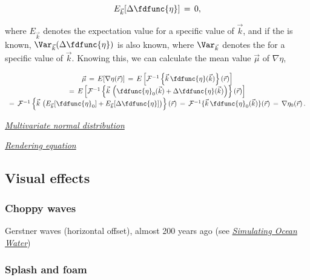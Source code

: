 \begin{equation}
E_{\vec{k}}[\Delta\fdfunc{\eta}] \,=\, 0,
\end{equation}

where $E_{\vec{k}}$ denotes the expectation value for a specific value of $\vec{k}$, and if the  is known, $\Var_{\vec{k}}(\Delta\fdfunc{\eta})$ is also known, where $\Var_{\vec{k}}$ denotes the \variance for a specific value of $\vec{k}$. Knowing this, we can calculate the mean value $\vec{\mu}$ of $\nabla\eta$,

\begin{equation}
\begin{array}{c}
\vec{\mu} \,=\, E[\nabla\eta(\vec{r})] \,=\, E\left[\mathcal{F}^{-1}\left\{\vec{k}\,\fdfunc{\eta}(\vec{k})\right\}(\vec{r})\right] \\
=\, E\left[\mathcal{F}^{-1}\left\{\vec{k}\,\left(\fdfunc{\eta}_0(\vec{k})+\Delta\fdfunc{\eta}(\vec{k})\right)\right\}(\vec{r})\right] \\
=\, \mathcal{F}^{-1}\left\{\vec{k}\,\left(E_{\vec{k}}[\fdfunc{\eta}_0]+E_{\vec{k}}[\Delta\fdfunc{\eta}]\right)\right\}(\vec{r}) \,=\, \mathcal{F}^{-1}\{\vec{k}\,\fdfunc{\eta}_0(\vec{k})\}(\vec{r}) \,=\, \nabla\eta_0(\vec{r})\,.
\end{array}
\end{equation}

\textit{\href{http://en.wikipedia.org/wiki/Multivariate\_normal\_distribution\#Non-degenerate\_case}{Multivariate normal distribution}}

\textit{\href{http://en.wikipedia.org/wiki/Rendering\_equation}{Rendering equation}}

\subsection{Visual effects}

\subsubsection{Choppy waves}



Gerstner waves (horizontal offset), almost 200 years ago (see \textit{\href{http://graphics.ucsd.edu/courses/rendering/2005/jdewall/tessendorf.pdf}{Simulating Ocean Water}})

\subsubsection{Splash and foam}

